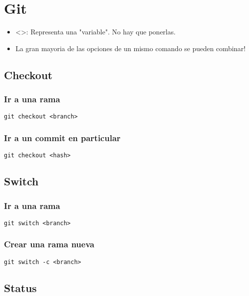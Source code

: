 \documentclass[11pt]{article}
\date{\today}
\title{}
\begin{document}
\tableofcontents

\section{Git}
\label{sec:org6dc9dbb}
\begin{itemize}
\item <>: Representa una "variable". No hay que ponerlas.
\item La gran mayoria de las opciones de un mismo comando se pueden combinar!
\end{itemize}

\subsection{Checkout}
\label{sec:orgcfe4c1b}
\subsubsection{Ir a una rama}
\label{sec:org9880c70}
\begin{verbatim}
git checkout <branch>
\end{verbatim}

\subsubsection{Ir a un commit en particular}
\label{sec:org0d25083}
\begin{verbatim}
git checkout <hash>
\end{verbatim}

\subsection{Switch}
\label{sec:org4f94128}
\subsubsection{Ir a una rama}
\label{sec:orge17a11f}
\begin{verbatim}
git switch <branch>
\end{verbatim}
\subsubsection{Crear una rama nueva}
\label{sec:org688b20b}
\begin{verbatim}
git switch -c <branch>
\end{verbatim}

\subsection{Status}
\label{sec:orgc0d2f26}
\end{document}
